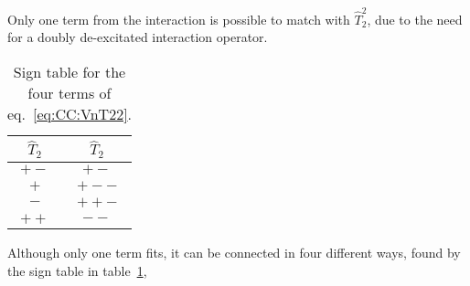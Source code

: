 Only one term from the interaction is possible to match with $\hat{T}_2^2$, due to the need for a doubly de-excitated interaction operator.
\begin{table}
\caption{Sign table for the four terms of eq.~\eqref{eq:CC:VnT22}.}
\label{tab:CC:SignVnT22}
\begin{center}
\begin{tabular}{c|c}
$\hat{T}_2$ & $\hat{T}_2$ \\ 
\hline 
$+-$ & $+-$ \\ 
$+$ & $+--$ \\ 
$-$ & $++-$ \\
$++$ & $--$
\end{tabular} 
\end{center}
\end{table}
Although only one term fits, it can be connected in four different ways, found by the sign table in table~\ref{tab:CC:SignVnT22},
